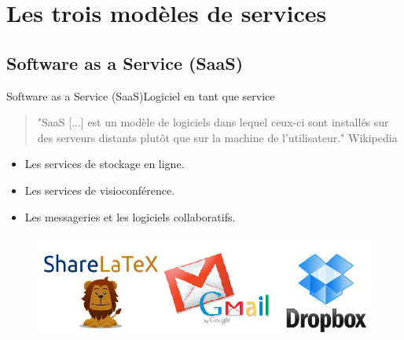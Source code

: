 \documentclass{beamer}
\begin{document}
\section{Les trois modèles de services}

\subsection{Software as a Service (SaaS)}
\begin{frame}{Software as a Service (SaaS)}{Logiciel en tant que service}
\begin{block}{}
\begin{quotation}
"SaaS [...] est un modèle de logiciels dans lequel ceux-ci sont installés sur des serveurs distants plutôt que sur la machine de l'utilisateur."
\hfill{Wikipedia}
\end{quotation}
\end{block}
\pause
\begin{itemize}
\item Les services de stockage en ligne.
\item Les services de visioconférence.
\item Les messageries et les logiciels collaboratifs.
\end{itemize}

\begin{figure}[centering]
    \includegraphics[scale=0.5]{icon}
\end{figure}
\end{frame}
\end{document}
